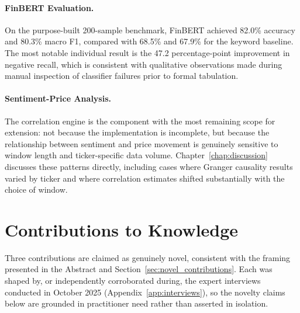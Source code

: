 \paragraph{FinBERT Evaluation.}
On the purpose-built 200-sample benchmark, FinBERT achieved 82.0\% accuracy and 80.3\% macro F1, compared with 68.5\% and 67.9\% for the keyword baseline. The most notable individual result is the 47.2 percentage-point improvement in negative recall, which is consistent with qualitative observations made during manual inspection of classifier failures prior to formal tabulation.

\paragraph{Sentiment-Price Analysis.}
The correlation engine is the component with the most remaining scope for extension: not because the implementation is incomplete, but because the relationship between sentiment and price movement is genuinely sensitive to window length and ticker-specific data volume. Chapter~\ref{chap:discussion} discusses these patterns directly, including cases where Granger causality results varied by ticker and where correlation estimates shifted substantially with the choice of window.

\section{Contributions to Knowledge}

Three contributions are claimed as genuinely novel, consistent with the framing presented in the Abstract and Section~\ref{sec:novel_contributions}. Each was shaped by, or independently corroborated during, the expert interviews conducted in October 2025 (Appendix~\ref{app:interviews}), so the novelty claims below are grounded in practitioner need rather than asserted in isolation.

